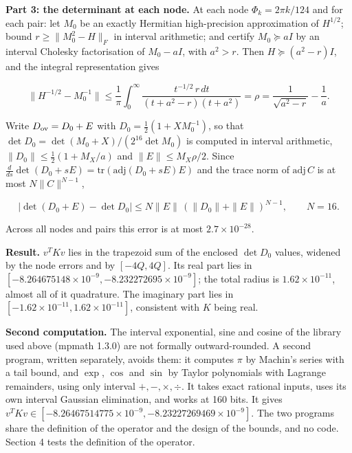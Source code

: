 \documentclass[11pt,a4paper]{article}
\begin{document}
{\bfseries\boldmath Part 3: the determinant at each node.} At each node $\Phi_k=2\pi k/124$ and for each pair: let $M_0$ be an exactly Hermitian high-precision approximation of $H^{1/2}$; bound $r\ge\|M_0^2-H\|_F$ in interval arithmetic; and certify $M_0\succeq aI$ by an interval Cholesky factorisation of $M_0-aI$, with $a^2>r$. Then $H\succeq(a^2-r)I$, and the integral representation gives


\begin{equation*}
\|H^{-1/2}-M_0^{-1}\|\le\frac1\pi\int_0^\infty\frac{t^{-1/2}\,r\,dt}{(t+a^2-r)(t+a^2)}=\rho=\frac1{\sqrt{a^2-r}}-\frac1a.
\end{equation*}


Write $D_{\rm ov}=D_0+E$ with $D_0=\tfrac12(1+XM_0^{-1})$, so that $\det D_0=\det(M_0+X)/(2^{16}\det M_0)$ is computed in interval arithmetic, $\|D_0\|\le\tfrac12(1+M_X/a)$ and $\|E\|\le M_X\rho/2$. Since $\tfrac{d}{ds}\det(D_0+sE)=\mathrm{tr}(\mathrm{adj}(D_0+sE)E)$ and the trace norm of $\mathrm{adj}\,C$ is at most $N\|C\|^{N-1}$,


\begin{equation*}
|\det(D_0+E)-\det D_0|\le N\|E\|\,(\|D_0\|+\|E\|)^{N-1},\qquad N=16.
\end{equation*}


Across all nodes and pairs this error is at most $2.7\times10^{-28}$.

{\bfseries\boldmath Result.} $v^TKv$ lies in the trapezoid sum of the enclosed $\det D_0$ values, widened by the node errors and by $[-4Q,4Q]$. Its real part lies in $[-8.264675148\times10^{-9},-8.232272695\times10^{-9}]$; the total radius is $1.62\times10^{-11}$, almost all of it quadrature. The imaginary part lies in $[-1.62\times10^{-11},1.62\times10^{-11}]$, consistent with $K$ being real.

{\bfseries\boldmath Second computation.} The interval exponential, sine and cosine of the library used above (mpmath 1.3.0) are not formally outward-rounded. A second program, written separately, avoids them: it computes $\pi$ by Machin's series with a tail bound, and $\exp$, $\cos$ and $\sin$ by Taylor polynomials with Lagrange remainders, using only interval $+,-,\times,\div$. It takes exact rational inputs, uses its own interval Gaussian elimination, and works at 160 bits. It gives $v^TKv\in[-8.26467514775\times10^{-9},-8.23227269469\times10^{-9}]$. The two programs share the definition of the operator and the design of the bounds, and no code. Section 4 tests the definition of the operator.
\end{document}
